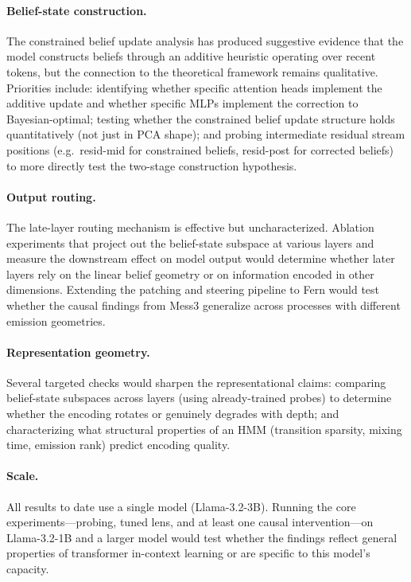 \documentclass[midterm]{sparreport}
\begin{document}
\paragraph{Belief-state construction.}
The constrained belief update analysis has produced suggestive evidence that the model constructs beliefs through an additive heuristic operating over recent tokens, but the connection to the theoretical framework remains qualitative. Priorities include: identifying whether specific attention heads implement the additive update and whether specific MLPs implement the correction to Bayesian-optimal; testing whether the constrained belief update structure holds quantitatively (not just in PCA shape); and probing intermediate residual stream positions (e.g.\ resid-mid for constrained beliefs, resid-post for corrected beliefs) to more directly test the two-stage construction hypothesis.

\paragraph{Output routing.}
The late-layer routing mechanism is effective but uncharacterized. Ablation experiments that project out the belief-state subspace at various layers and measure the downstream effect on model output would determine whether later layers rely on the linear belief geometry or on information encoded in other dimensions. Extending the patching and steering pipeline to Fern would test whether the causal findings from Mess3 generalize across processes with different emission geometries.

\paragraph{Representation geometry.}
Several targeted checks would sharpen the representational claims: comparing belief-state subspaces across layers (using already-trained probes) to determine whether the encoding rotates or genuinely degrades with depth; and characterizing what structural properties of an HMM (transition sparsity, mixing time, emission rank) predict encoding quality.

\paragraph{Scale.}
All results to date use a single model (Llama-3.2-3B). Running the core experiments---probing, tuned lens, and at least one causal intervention---on Llama-3.2-1B and a larger model would test whether the findings reflect general properties of transformer in-context learning or are specific to this model's capacity.



\end{document}
